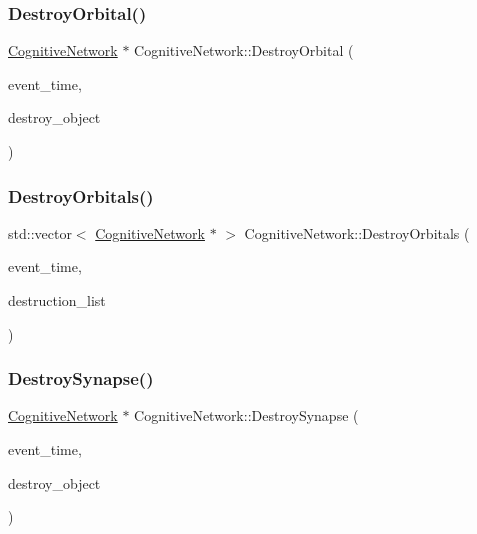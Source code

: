\subsubsection{\texorpdfstring{Destroy\+Orbital()}{DestroyOrbital()}}
{\footnotesize\ttfamily \mbox{\hyperlink{classCognitiveNetwork}{Cognitive\+Network}} $\ast$ Cognitive\+Network\+::\+Destroy\+Orbital (\begin{DoxyParamCaption}\item[{std\+::chrono\+::time\+\_\+point$<$ \mbox{\hyperlink{universe_8h_a0ef8d951d1ca5ab3cfaf7ab4c7a6fd80}{Clock}} $>$}]{event\+\_\+time,  }\item[{\mbox{\hyperlink{classCognitiveNetwork}{Cognitive\+Network}} $\ast$}]{destroy\+\_\+object }\end{DoxyParamCaption})}

\mbox{\label{classCognitiveNetwork_a0ee8259d26e30779bf06471fb8a10bb5}} 
\subsubsection{\texorpdfstring{Destroy\+Orbitals()}{DestroyOrbitals()}}
{\footnotesize\ttfamily std\+::vector$<$ \mbox{\hyperlink{classCognitiveNetwork}{Cognitive\+Network}} $\ast$ $>$ Cognitive\+Network\+::\+Destroy\+Orbitals (\begin{DoxyParamCaption}\item[{std\+::chrono\+::time\+\_\+point$<$ \mbox{\hyperlink{universe_8h_a0ef8d951d1ca5ab3cfaf7ab4c7a6fd80}{Clock}} $>$}]{event\+\_\+time,  }\item[{std\+::vector$<$ \mbox{\hyperlink{classCognitiveNetwork}{Cognitive\+Network}} $\ast$$>$}]{destruction\+\_\+list }\end{DoxyParamCaption})}

\mbox{\label{classCognitiveNetwork_a08b87aa9a0823355ef7cef77414dc6dc}} 
\subsubsection{\texorpdfstring{Destroy\+Synapse()}{DestroySynapse()}}
{\footnotesize\ttfamily \mbox{\hyperlink{classCognitiveNetwork}{Cognitive\+Network}} $\ast$ Cognitive\+Network\+::\+Destroy\+Synapse (\begin{DoxyParamCaption}\item[{std\+::chrono\+::time\+\_\+point$<$ \mbox{\hyperlink{universe_8h_a0ef8d951d1ca5ab3cfaf7ab4c7a6fd80}{Clock}} $>$}]{event\+\_\+time,  }\item[{\mbox{\hyperlink{classCognitiveNetwork}{Cognitive\+Network}} $\ast$}]{destroy\+\_\+object }\end{DoxyParamCaption})}

